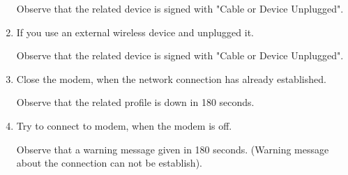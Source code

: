 \documentclass[a4paper,10pt]{article}
\begin{document}
\begin{enumerate}
	Observe that the related device is signed with "Cable or Device Unplugged".

	\item If you use an external wireless device and unplugged it.

    Observe that the related device is signed with "Cable or Device Unplugged".

	\item Close the modem, when the network connection has already established.

	Observe that the related profile is down in 180 seconds.

	\item Try to connect to modem, when the modem is off.

	 Observe that a warning message given in 180 seconds. (Warning message about the connection can not be establish).
\end{enumerate}
\end{document}

